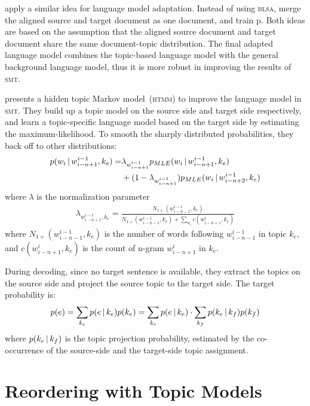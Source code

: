 \citet{Ruiz-2011} apply a similar idea for language model
adaptation. Instead of using \textsc{blsa}, \citet{Ruiz-2011} 
merge the aligned source and target document as one document, and
train p. Both ideas are
based on the assumption that the aligned source document and target
document share the same document-topic distribution. The final adapted
language model combines the topic-based language model with the
general background language model, thus it is more robust in improving
the results of \textsc{smt}.


\citet{Yu-2013} presents a hidden topic Markov model~(\textsc{htmm}) to improve
the language model in \textsc{smt}. They build up a topic model on the
source side and target side respectively, and learn a topic-specific
language model based on the target side by estimating the
maximum-likelihood. To smooth the sharply distributed probabilities,
they back off to other distributions:
\begin{align}
p(w_i \, | \, w^{i-1}_{i-n+1}, k_e) = &\lambda_{w^{i-1}_{i-n+1}}
                                   p_{MLE}(w_i \, | \, w^{i-1}_{i-n+1}, k_e) \\
&+ (1- \lambda_{w^{i-1}_{i-n+1}})p_{MLE}(w_i \, | \, w^{i-1}_{i-n+2}, k_e)
\end{align}
where $\lambda$ is the normalization parameter
\begin{align}
\lambda_{w^{i-1}_{i-n+1}, k_e} = \frac{N_{1+}(w^{i-1}_{i-n-1},
  k_e)}{N_{1+}(w^{i-1}_{i-n-1}, k_e) + \sum_{w_i}c(w^i_{i-n+1}, k_e)}
\end{align}
where $N_{1+}(w^{i-1}_{i-n-1}, k_e)$ is the number of words following
$w^{i-1}_{i-n-1}$ in topic $k_e$, and $c(w^i_{i-n+1}, k_e)$ is the
count of n-gram $w^i_{i-n+1}$ in $k_e$.

During decoding, since no target sentence is available, they extract the topics on the 
source side and project the source topic to the target side. 
The target probability is:
\begin{align}
p(e) = \sum_{k_e} p(e \, | \, k_e) p(k_e) = \sum_{k_e} p(e \, | \, k_e) \cdot
  \sum_{k_f} p(k_e \, | \, k_f) p (k_f)
\end{align}
where $p(k_e \, | \, k_f)$ is the topic projection probability, estimated by
the co-occurrence of the source-side and the target-side topic assignment.


\section{Reordering with Topic Models}

